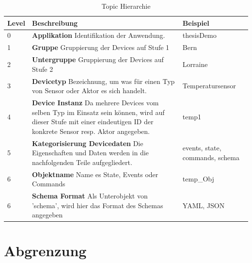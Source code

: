 \begin{table}[H]
\begin{tabularx}{\textwidth}{|l|X|l|}

 \hline \rowcolor{lightgray}
 {\bf Level } & {\bf Beschreibung } & {\bf Beispiel } \\ 
 \hline
 0  &   \textbf{Applikation} \newline Identifikation der Anwendung.  &    
  thesisDemo   \\ \hline
 
 1  &   \textbf{Gruppe}  \newline Gruppierung der Devices auf Stufe 1 &   Bern  \\ \hline

 2  &   \textbf{Untergruppe} \newline Gruppierung der Devices auf Stufe 2   &   Lorraine  \\ \hline

 3  &   \textbf{Devicetyp} \newline Bezeichnung, um was für einen Typ von Sensor oder Aktor es sich handelt.  &   Temperatursensor   \\ \hline

 4  &   \textbf{Device Instanz} \newline Da mehrere Devices vom selben Typ im Einsatz sein können, wird auf dieser Stufe mit einer eindeutigen ID der konkrete Sensor resp. Aktor angegeben.   &    temp1   \\ \hline
 
 5  &   \textbf{Kategorisierung Devicedaten} \newline  Die Eigenschaften und Daten werden in die nachfolgenden Teile aufgegliedert.  &     events, state, commands, schema   \\ \hline
 
 6  &   \textbf{Objektname} \newline Name es State, Events oder Commands    &     temp\_Obj   \\ \hline

 6  &   \textbf{Schema Format} \newline Als Unterobjekt von 'schema', wird hier das Format des Schemas angegeben   &     YAML, JSON   \\ \hline
 

\end{tabularx}
\caption{Topic Hierarchie}
\end{table}


\section{Abgrenzung}

